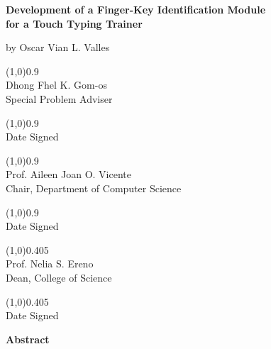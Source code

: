 \documentclass{report}
\begin{document}
\begin{center}
	\textbf{Development of a Finger-Key Identification Module\\for a Touch Typing Trainer}
	\par\vspace{0.5cm}
	by
	Oscar Vian L. Valles

	\par\vspace{2cm}

	\begin{minipage}[t]{0.45\textwidth}
		\centering
		\line(1,0){0.9\textwidth}\\
		Dhong Fhel K. Gom-os\\
		Special Problem Adviser

		\par\vspace{0.5cm}
		\line(1,0){0.9\textwidth}\\
		Date Signed
	\end{minipage}
	\begin{minipage}[t]{0.45\textwidth}
		\centering
		\line(1,0){0.9\textwidth}\\
		Prof. Aileen Joan O. Vicente\\
		Chair, Department of Computer Science

		\par\vspace{0.5cm}
		\line(1,0){0.9\textwidth}\\
		Date Signed
	\end{minipage}

	\par\vspace{2cm}

	\line(1,0){0.405\textwidth}\\
	Prof. Nelia S. Ereno\\
	Dean, College of Science

	\par\vspace{0.5cm}
	\line(1,0){0.405\textwidth}\\
	Date Signed

	\par\vspace{2cm}
\end{center}

\newpage

\begin{center}
	\LARGE\textbf{Abstract}
\end{center}
\end{document}
